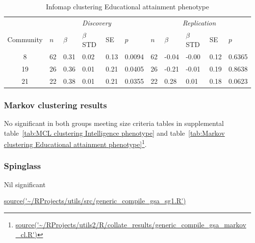 \begin{table}[ht]
\centering
\setlength{\extrarowheight}{2pt}
\begin{tabular}{cllllllllll}
  \toprule
   &  \multicolumn{5}{c}{\textit{Discovery}} & \multicolumn{5}{c}{\textit{Replication}} \\
    \cmidrule{2-11}
Community & $n$ & $\beta$ & $\beta$ STD & SE & $p$ & $n$ & $\beta$ & $\beta$ STD & SE & $p$\\ 
  \midrule
8 & 62 & 0.31 & 0.02 & 0.13 & 0.0094 & 62 & -0.04 & -0.00 & 0.12 & 0.6365 \\ 
  19 & 26 & 0.36 & 0.01 & 0.21 & 0.0405 & 26 & -0.21 & -0.01 & 0.19 & 0.8638 \\ 
  21 & 22 & 0.38 & 0.01 & 0.21 & 0.0355 & 22 & 0.28 & 0.01 & 0.18 & 0.0623 \\ 
   \bottomrule
\end{tabular}
\caption{Infomap clustering Educational attainment phenotype} 
\label{tab:Infomap clustering Educational attainment phenotype}
\end{table}
\subsubsection{Markov clustering results}


No significant in both groups meeting size criteria tables in supplemental table~\ref{tab:MCL clustering Intelligence phenotype} and table~\ref{tab:Markov clustering Educational attainment phenotype}\footnote{\tiny \url{source('~/RProjects/utils2/R/collate_results/generic_compile_gsa_markov_cl.R')}}.

\subsubsection{Spinglass}
Nil significant

\url{source('~/RProjects/utils/src/generic_compile_gsa_sg1.R')}





 



